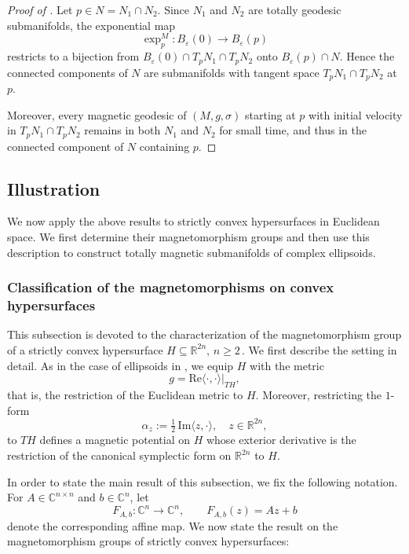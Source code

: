 \documentclass[11pt,reqno]{amsart}
\newcommand{\IR}{{\mathbb R}}%
\newcommand{\CC}{\mathcal{C}}
\renewcommand{\Im}{{\rm Im}}
\newcommand{\C}{\mathbb C}
\theoremstyle{plain}
\theoremstyle{definition}
\numberwithin{equation}{section}
\def\CC{{\mathbb C}}
\def\RR{{\mathbb R}}
\def\Im{{\mathrm{Im}}}
\begin{document}
\begin{proof}[Proof of ]
Let $p \in N = N_1 \cap N_2$. Since $N_1$ and $N_2$ are totally geodesic submanifolds, the exponential map
\[
\exp^M_p : B_\varepsilon(0) \longrightarrow B_\varepsilon(p)
\]
restricts to a bijection from $B_\varepsilon(0) \cap T_p N_1 \cap T_p N_2$ onto $B_\varepsilon(p) \cap N$. Hence the connected components of $N$ are submanifolds with tangent space $T_p N_1 \cap T_p N_2$ at $p$.

Moreover, every magnetic geodesic of $(M,g,\sigma)$ starting at $p$ with initial velocity in $T_p N_1 \cap T_p N_2$ remains in both $N_1$ and $N_2$ for small time, and thus in the connected component of $N$ containing $p$.
\end{proof}

\subsection{Illustration}
\label{subsection: magnetic geometry- illustration}

We now apply the above results to strictly convex hypersurfaces in Euclidean space. We first determine their magnetomorphism groups and then use this description to construct totally magnetic submanifolds of complex ellipsoids.

\subsubsection{Classification of the magnetomorphisms on convex hypersurfaces}
\label{subsubsection: magnetomorphism group convex hypersurfaces}
This subsection is devoted to the characterization of the magnetomorphism group of a strictly convex hypersurface $H \subseteq \RR^{2n} , \, n \geq 2 \,$. We first describe the setting in detail. As in the case of ellipsoids in , we equip $H$ with the metric
\[
g=\mathrm{Re}\langle\cdot,\cdot\rangle|_{TH},
\]
that is, the restriction of the Euclidean metric to $H$. Moreover, restricting the $1$-form
\[
\alpha_z := \tfrac12\,\Im\langle z,\cdot\rangle,\quad z\in \RR^{2n},
\]
to $TH$ defines a magnetic potential on $H$ whose exterior derivative is the restriction of the canonical symplectic form on $\IR^{2n}$ to $H$.

In order to state the main result of this subsection, we fix the following notation. For $A \in \CC^{n \times n}$ and $b \in \C^n$, let
\begin{equation}\label{eq:affine_trafo}
    F_{A,b} : \C^n \longrightarrow \C^n, \qquad F_{A,b}(z) = Az + b
\end{equation}
denote the corresponding affine map. We now state the result on the magnetomorphism groups of strictly convex hypersurfaces:
\end{document}
